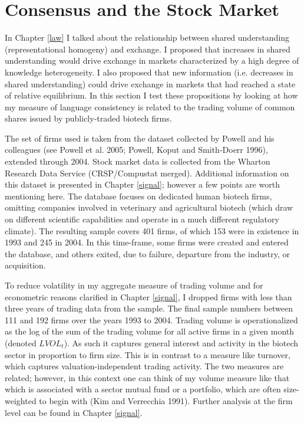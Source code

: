  
\section{Consensus and the Stock Market}

In Chapter \ref{law} I talked about the relationship between shared understanding (representational homogeny) and exchange.  I proposed that increases in shared understanding would drive exchange in markets characterized by a high degree of knowledge heterogeneity. I also proposed that new information (i.e. decreases in shared understanding) could drive exchange in markets that had reached a state of relative equilibrium. In this section I test these propositions by looking at how my measure of language consistency is related to the trading volume of common shares issued by publicly-traded biotech firms.

The set of firms used is taken from the dataset collected by Powell and his colleagues (see Powell et al. 2005; Powell, Koput and Smith-Doerr 1996), extended through 2004. Stock market data is collected from the Wharton Research Data Service (CRSP/Compustat merged). Additional information on this dataset is presented in Chapter \ref{signal}; however a few points are worth mentioning here. The database focuses on dedicated human biotech firms, omitting companies involved in veterinary and agricultural biotech (which draw on different scientific capabilities and operate in a much different regulatory climate). The resulting sample covers 401 firms, of which 153 were in existence in 1993 and 245 in 2004. In this time-frame, some firms were created and entered the database, and others exited, due to failure, departure from the industry, or acquisition. 

To reduce volatility in my aggregate measure of trading volume and for econometric reasons clarified in Chapter \ref{signal}, I dropped firms with less than three years of trading data from the sample. The final sample numbers between 111 and 192 firms over the years 1993 to 2004. Trading volume is operationalized as the log of the sum of the trading volume for all active firms in a given month (denoted $LVOL_t$). As such it captures general interest and activity in the biotech sector in proportion to firm size. This is in contrast to a measure like turnover, which captures valuation-independent trading activity. The two measures are related; however, in this context one can think of my volume measure like that which is associated with a sector mutual fund or a portfolio, which are often size-weighted to begin with (Kim and Verrecchia 1991). Further analysis at the firm level can be found in Chapter \ref{signal}.

